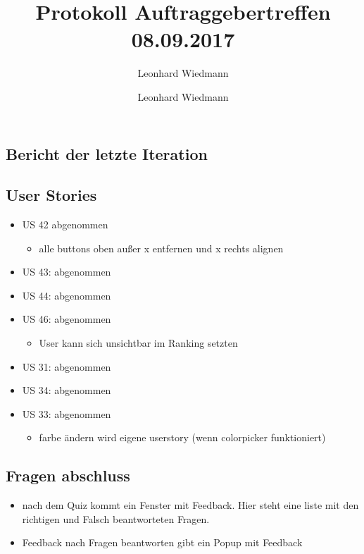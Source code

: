 \documentclass[colorback, accentcolor=tud1c, paper=a4]{tudexercise}
\title{Protokoll Auftraggebertreffen 08.09.2017}
\subtitle{Leonhard Wiedmann}
\author{Leonhard Wiedmann}
\begin{document}
\maketitle

\begin{multicols}{2}

\section*{Bericht der letzte Iteration}
\subsection*{User Stories}
\begin{itemize}
	\item US 42 abgenommen
	\begin{itemize}
		\item alle buttons oben außer x entfernen und x rechts alignen
	\end{itemize}
	\item US 43: abgenommen
	\item US 44: abgenommen
	\item US 46: abgenommen
	\begin{itemize}
		\item User kann sich unsichtbar im Ranking setzten
	\end{itemize}
	\item US 31: abgenommen
	\item US 34: abgenommen
	\item US 33: abgenommen
	\begin{itemize}
		\item farbe ändern wird eigene userstory (wenn colorpicker funktioniert)
	\end{itemize}
\end{itemize}

\subsection*{Fragen abschluss}
\begin{itemize}
	\item nach dem Quiz kommt ein Fenster mit Feedback. Hier steht eine liste mit den richtigen und Falsch beantworteten Fragen.
\item Feedback nach Fragen beantworten gibt ein Popup mit Feedback
\end{itemize}



\end{multicols}
\end{document}

